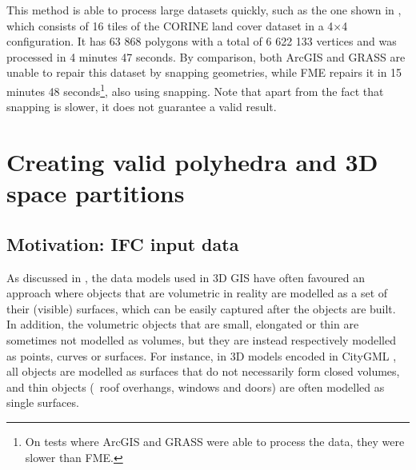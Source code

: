 This method is able to process large datasets quickly, such as the one shown in , which consists of 16 tiles of the CORINE land cover dataset in a 4$\times$4 configuration.
It has 63 868 polygons with a total of 6 622 133 vertices and was processed in 4 minutes 47 seconds.
By comparison, both ArcGIS and GRASS are unable to repair this dataset by snapping geometries, while FME repairs it in 15 minutes 48 seconds\footnote{On tests where ArcGIS and GRASS were able to process the data, they were slower than FME.}, also using snapping.
Note that apart from the fact that snapping is slower, it does not guarantee a valid result.

\section{Creating valid polyhedra and 3D space partitions}
\label{se:3drepair}

\subsection{Motivation: IFC input data}

As discussed in , the data models used in 3D GIS have often favoured an approach where objects that are volumetric in reality are modelled as a set of their (visible) surfaces, which can be easily captured after the objects are built.
In addition, the volumetric objects that are small, elongated or thin are sometimes not modelled as volumes, but they are instead respectively modelled as points, curves or surfaces.
For instance, in 3D models encoded in CityGML \citep{CityGML2}, all objects are modelled as surfaces that do not necessarily form closed volumes, and thin objects (\eg\ roof overhangs, windows and doors) are often modelled as single surfaces.


